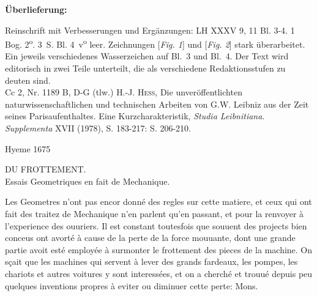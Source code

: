 \begin{ledgroupsized}[r]{120mm}
\footnotesize
\pstart
\noindent\textbf{\"{U}berlieferung:}
\pend
\end{ledgroupsized}
%
\begin{ledgroupsized}[r]{114mm}
\footnotesize
\pstart \parindent -6mm
Reinschrift mit Verbesserungen und Ergänzungen:
LH XXXV 9, 11 Bl. 3-4.
1 Bog. 2\textsuperscript{o}.
3~S. Bl. 4~v\textsuperscript{o} leer.
Zeichnungen [\textit{Fig. 1}] und [\textit{Fig. 2}] stark \"{u}berarbeitet.
Ein jeweils verschiedenes Wasserzeichen auf Bl.~3 und Bl.~4.
Der Text wird editorisch in zwei Teile unterteilt, die als verschiedene Redaktionsstufen zu deuten sind.%
 \\Cc 2, Nr. 1189 B, D-G
\pend
\pstart \parindent -6mm
(tlw.) \cite{00188}\textsc{H.-J. Hess}, \glqq Die unver\"{o}ffentlichten naturwissenschaftlichen und technischen Arbeiten von G.W. Leibniz aus der Zeit seines Parisaufenthaltes. Eine Kurzcharakteristik\grqq, \textit{Studia Leibnitiana. Supplementa} XVII (1978), S. 183-217: S. 206-210.
\pend
\end{ledgroupsized}
\vspace*{8mm}
\pstart
\normalsize
\noindent
[3~r\textsuperscript{o}]
Hyeme 1675
\pend
\pstart
\begin{center}
DU FROTTEMENT.\\
Essais Geometriques en fait de Mechanique.
\end{center}	
\pend
\vspace*{1em}
\pstart
{}
\pend
\pstart
\noindent
Les Geometres n'ont pas encor donn\'{e} des regles sur cette matiere,
et ceux qui ont fait des traitez de Mechanique n'en parlent qu'en passant,
et pour la renvoyer \`{a} l'experience des ouuriers.
Il est constant toutesfois que souuent des projects bien conceus ont avort\'{e} \`{a} cause de la perte de la force mouuante,
dont une grande partie avoit est\'{e} employ\'{e}e \`{a} surmonter le
frottement\protect{}
des pieces de la
machine\protect{}.
On s\c{c}ait que les machines qui servent \`{a} lever des grands fardeaux,
les pompes\protect{},
les chariots et autres voitures y sont interess\'{e}es,
et on a cherch\'{e} et trouu\'{e} depuis peu quelques inventions propres \`{a} eviter ou diminuer cette perte:
Mons. 
